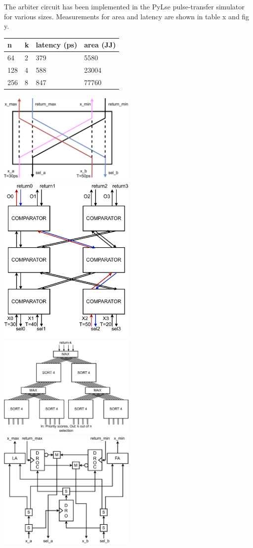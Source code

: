 \documentclass{article}
\begin{document}
The arbiter circuit has been implemented in the PyLse
pulse-transfer simulator for various sizes. Measurements for
area and latency are shown in table x and fig y.

\begin{table}[]
\begin{tabular}{|l|l|l|l|}
\hline
n   & k & latency (ps) & area (JJ) \\ \hline
64  & 2 & 379          & 5580      \\ \hline
128 & 4 & 588          & 23004     \\ \hline
256 & 8 & 847          & 77760     \\ \hline
\end{tabular}
\end{table}

\includegraphics*[width=0.5\textwidth]{diagrams/comparator.drawio.pdf}
\includegraphics*[width=0.5\textwidth]{diagrams/sort4.drawio.pdf}
\includegraphics*[width=0.5\textwidth]{diagrams/arbiterk4n16.drawio.pdf}
\includegraphics*[width=0.5\textwidth]{diagrams/circuit_comparator.drawio.pdf}
\end{document}
